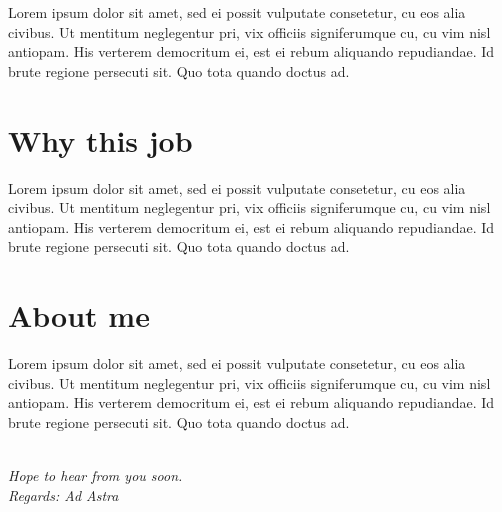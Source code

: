 Lorem ipsum dolor sit amet, sed ei possit vulputate consetetur, cu eos alia civibus. Ut mentitum neglegentur pri, vix officiis signiferumque cu, cu vim nisl antiopam. His verterem democritum ei, est ei rebum aliquando repudiandae. Id brute regione persecuti sit. Quo tota quando doctus ad.

\section*{Why this job}
Lorem ipsum dolor sit amet, sed ei possit vulputate consetetur, cu eos alia civibus. Ut mentitum neglegentur pri, vix officiis signiferumque cu, cu vim nisl antiopam. His verterem democritum ei, est ei rebum aliquando repudiandae. Id brute regione persecuti sit. Quo tota quando doctus ad.

\section*{About me}
Lorem ipsum dolor sit amet, sed ei possit vulputate consetetur, cu eos alia civibus. Ut mentitum neglegentur pri, vix officiis signiferumque cu, cu vim nisl antiopam. His verterem democritum ei, est ei rebum aliquando repudiandae. Id brute regione persecuti sit. Quo tota quando doctus ad.

\textit{\\ Hope to hear from you soon. \\
 Regards: Ad Astra
}
